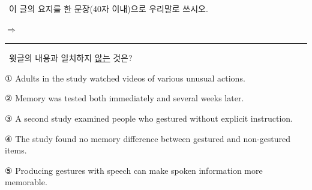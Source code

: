 \documentclass[11pt,a4paper]{article}
\newcommand{\qno}[1]{\par\vspace{8pt}\noindent{\sffamily\bfseries #1.}\ }
\newcommand{\instr}[1]{{\sffamily #1}\par\vspace{3pt}}
\begin{document}
\qno{3}\instr{[서술형] 이 글의 요지를 한 문장(40자 이내)으로 우리말로 쓰시오.}
\par\vspace{6pt}\noindent
$\Rightarrow$ \rule{10cm}{0.4pt}

\qno{4}\instr{윗글의 내용과 일치하지 \underline{않는} 것은?}
\begin{choices}
\item ① Adults in the study watched videos of various unusual actions.
\item ② Memory was tested both immediately and several weeks later.
\item ③ A second study examined people who gestured without explicit instruction.
\item ④ The study found no memory difference between gestured and non-gestured items.
\item ⑤ Producing gestures with speech can make spoken information more memorable.
\end{choices}
\end{document}
